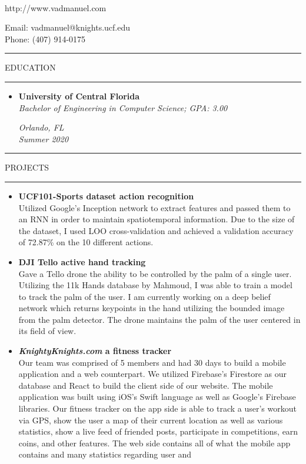 \documentclass{article}
\makeatletter
\newcommand{\name}{Manuel Vasquez}
\newcommand{\website}{http://www.vadmanuel.com}
\newcommand{\email}{vadmanuel@knights.ucf.edu}
\newcommand{\phone}{(407) 914-0175}
\newcommand{\makeminipage}[4]{
    \begin{minipage}[c]{9cm}
        \flushleft #1 \\ #2
    \end{minipage} \hfill
    \begin{minipage}[c]{9cm}
        \flushright #3 \\ #4
    \end{minipage}
}
\newcommand{\makesection}[1]{\hrule\vskip1mm\uppercase{#1}\vskip1mm\hrule}
\makeatother
\begin{document}
    \setlength{\parindent}{0cm}

    \makeminipage
        {{\large\textbf{\name}}}
        {\website}
        {Email: \email}
        {Phone: \phone}
    \bigbreak

    \makesection{Education}
    \begin{itemize}[leftmargin=.35cm]
        \item \makeminipage
            {\textbf{University of Central Florida}}
            {\textit{Bachelor of Engineering in Computer Science; GPA: 3.00}}
            {\textit{Orlando, FL}}
            {\textit{Summer 2020}}
    \end{itemize}

    \makesection{Projects}
    \begin{itemize}[leftmargin=.35cm]
        \item \textbf{UCF101-Sports dataset action recognition} \\
        Utilized Google's Inception network to extract features and passed them to an RNN
        in order to maintain spatiotemporal information. Due to the size of the dataset, I
        used LOO cross-validation and achieved a validation accuracy of 72.87\% on the 10
        different actions.
        \item \textbf{DJI Tello active hand tracking} \\
        Gave a Tello drone the ability to be controlled by the palm of a single user. Utilizing
        the 11k Hands database by Mahmoud, I was able to train a model to track the palm of the
        user. I am currently working on a deep belief network which returns keypoints in the hand
        utilizing the bounded image from the palm detector. The drone maintains the palm of the user centered in its field of view.
        \item \textbf{\textit{KnightyKnights.com} a fitness tracker} \\
        Our team was comprised of 5 members and had 30 days to build a mobile application and a web
        counterpart. We utilized Firebase's Firestore as our database and React to build the client
        side of our website. The mobile application was built using iOS's Swift language as well as
        Google's Firebase libraries. Our fitness tracker on the app side is able to track a user's
        workout via GPS, show the user a map of their current location as well as various statistics,
        show a live feed of friended posts, participate in competitions, earn coins, and other features.
        The web side contains all of what the mobile app contains and many statistics regarding user and

\end{itemize}
\end{document}
